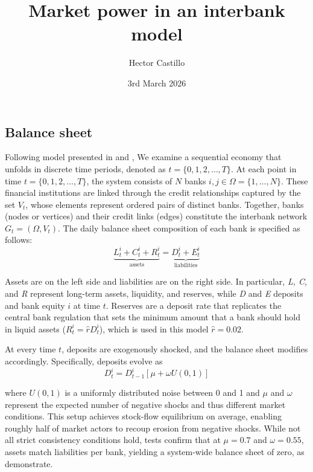 \documentclass{article}
\title{Market power in an interbank model}
\author{Hector Castillo}
\date{3rd March 2026}
\begin{document}
\maketitle


\subsection*{Balance sheet}

Following model presented in \cite{Delliggatti2024} and \cite{BRINI2023}, We examine a sequential economy that unfolds in discrete time periods, denoted as 
\( t = \{0, 1, 2, \ldots, T\} \). At each point in time \( t =  \{0, 1, 2, \ldots, T\} \), the system consists of \( N \)  banks \( i, j \in \Omega = \{1, \ldots, N\} \). These financial institutions are linked through the credit relationships captured by the set \( V_t \), whose elements represent ordered pairs of distinct banks. Together, banks (nodes or vertices) and their credit links (edges) constitute the 
interbank network \( G_t = (\Omega, V_t) \). The daily balance sheet composition of each bank is specified as follows:
\begin{equation}
\underbrace{L^i_t + C^i_t+ R^i_t}_{\text{assets}}= \underbrace{D^i_t+ E^i_t}_{\text{liabilities}}
\end{equation}

Assets are on the left side and liabilities are on the right side. In particular, \emph{L, C}, and \emph{R} represent long-term assets, liquidity, and reserves, while \emph{D} and \emph{E}
deposits and bank equity $i$ at time $t$. Reserves are a deposit rate that replicates the central bank regulation that sets the minimum amount that a bank should hold in liquid assets ($R^i_t=\hat{r}D^i_t$), which is used in this model $\hat{r}=0.02$.

At every time $t$, deposits are exogenously shocked, and the balance sheet modifies accordingly. Specifically, deposits evolve as
\begin{equation}
\label{evolution_d}
D^i_t = D^i_{t-1} [ \mu + \omega U(0,1)]
\end{equation}

where $U(0,1)$ is a uniformly distributed noise between 0 and 1 and $\mu$ and $\omega$ represent the expected number of negative shocks and thus different market conditions.
This setup achieves stock-flow equilibrium on average, enabling roughly half of market actors to recoup erosion from negative shocks. While not all strict consistency conditions hold, tests confirm that at $\mu=0.7$ and $\omega=0.55$, assets match liabilities per bank, yielding a system-wide balance sheet of zero, as \cite{BRINI2023} demonstrate.
\end{document}
